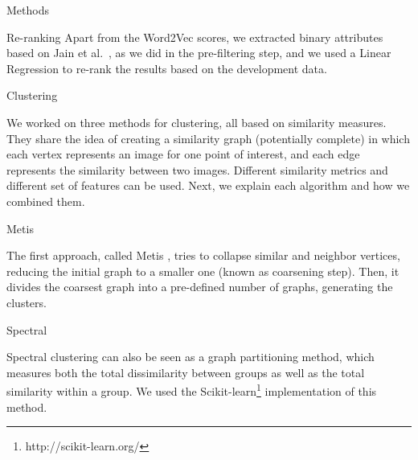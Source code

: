 \documentclass{acm_proc_article-me}
\begin{document}
\begin{section}{Methods}
\begin{subsection}{Re-ranking}
Apart from the Word2Vec scores, we extracted binary attributes based on Jain et al.~\cite{wsp13}, as we did in the pre-filtering step, and we used a Linear Regression to re-rank the results based on the development data.

\end{subsection}


\begin{subsection}{Clustering}

We worked on three methods for clustering, all based on similarity measures.
They share the idea of creating a similarity graph (potentially complete) in which each vertex represents an image for one point of interest, and
each edge represents the similarity between two images. Different similarity metrics and different set of features can be used.
Next, we explain each algorithm and how we combined them.


\begin{subsubsection}{Metis}

The first approach, called Metis \cite{metis},
tries to collapse similar and neighbor vertices, reducing the initial graph to a smaller one (known as coarsening step).
Then, it divides the coarsest graph into a pre-defined number of graphs, generating the clusters.  

\end{subsubsection}

\begin{subsubsection}{Spectral}

Spectral clustering \cite{spectral} can also be seen as a graph partitioning method, which measures both the total dissimilarity between groups 
as well as the total similarity within a group. We used the 
Scikit-learn\footnote{http://scikit-learn.org/} 
implementation of this method. 



\end{subsubsection}
\end{subsection}
\end{section}
\end{document}
